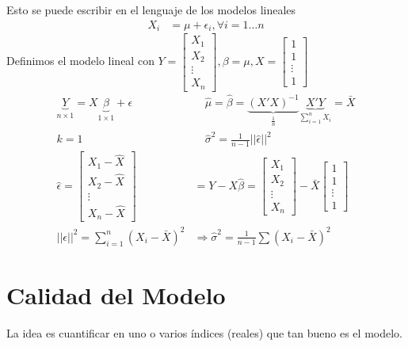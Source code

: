 \documentclass[10pt]{article}
\theoremstyle{plain}
\theoremstyle{definition}
\begin{document}
Esto se puede escribir en el lenguaje de los modelos lineales
\begin{align*}
X_{i} &= \mu + \epsilon_{i}, \forall i = 1\ldots n
\end{align*}
Definimos el modelo lineal con $Y = \begin{bmatrix}
           X_{1} \\
           X_{2} \\
           \vdots \\
           X_{n}
         \end{bmatrix}, \beta = \mu, X = \begin{bmatrix}
           1 \\
           1 \\
           \vdots \\
           1
         \end{bmatrix}$
\begin{align*}
\underbrace{Y}_{n\times 1}=X\underbrace{\beta}_{1\times 1} +\epsilon &\quad \hat{\mu} = \hat{\beta} = \underbrace{(X'X)^{-1}}_{\frac{1}{n}}\underbrace{X'Y}_{\sum_{i=1}^{n}X_{i}} = \bar{X}\\
k = 1 &\quad \hat{\sigma}^2 = \frac{1}{n-1} ||\hat{\epsilon}||^2\\
\hat{\epsilon} = \begin{bmatrix}
           X_{1} -\hat{X}\\
           X_{2} -\hat{X}\\
           \vdots \\
           X_{n} -\hat{X}
         \end{bmatrix} &= Y - X\hat{\beta} = \begin{bmatrix}
           X_{1} \\
           X_{2} \\
           \vdots \\
           X_{n}
         \end{bmatrix} - \bar{X} \begin{bmatrix}
           1 \\
           1 \\
           \vdots \\
           1
         \end{bmatrix}\\
||\epsilon||^2 = \sum_{i=1}^{n} (X_{i}-\bar{X})^2 &\Rightarrow \hat{\sigma}^2 = \frac{1}{n-1}\sum (X_{i}-\bar{X})^2
\end{align*}

\section{Calidad del Modelo}
La idea es cuantificar en uno o varios índices (reales) que tan bueno es el modelo.\\
\end{document}
